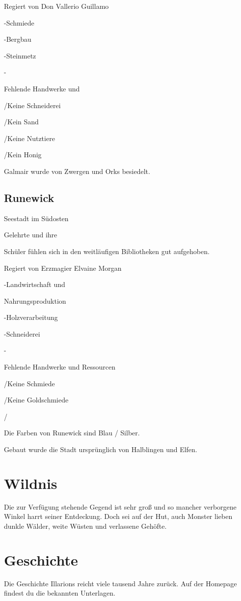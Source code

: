 \documentclass[a4paper,11pt]{book}
\begin{document}
Regiert von Don Vallerio Guillamo

-Schmiede

-Bergbau

-Steinmetz

-

Fehlende Handwerke und

/Keine Schneiderei

/Kein Sand

/Keine Nutztiere

/Kein Honig

Galmair wurde von Zwergen und Orks besiedelt.

\subsection{Runewick}

Seestadt im Südosten

Gelehrte und ihre

Schüler fühlen sich in den weitläufigen Bibliotheken gut aufgehoben.

Regiert von Erzmagier Elvaine Morgan

-Landwirtschaft und

Nahrungsproduktion

-Holzverarbeitung

-Schneiderei

-

Fehlende Handwerke und Ressourcen

/Keine Schmiede

/Keine Goldschmiede

/

Die Farben von Runewick sind Blau / Silber.

Gebaut wurde die Stadt ursprünglich von Halblingen und Elfen.

\section{Wildnis}

Die zur Verfügung stehende Gegend ist sehr groß und so mancher verborgene Winkel harrt seiner Entdeckung. Doch sei auf der Hut, auch Monster lieben dunkle Wälder, weite Wüsten und verlassene Gehöfte.

\section{Geschichte}

Die Geschichte Illarions reicht viele tausend Jahre zurück. Auf der Homepage findest du die bekannten Unterlagen.
\end{document}
